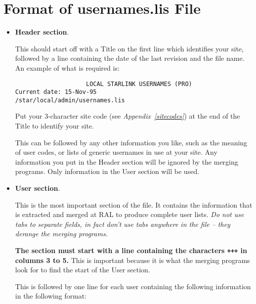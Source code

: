 \newpage

\section{\label{usernamesfile}Format of usernames.lis File}

\begin{itemize}

\item {\bf Header section}.

This should start off with a Title on the first line which identifies your site,
followed by a line containing the date of the last revision and the file name.
An example of what is required is:

\begin{verbatim}
                    LOCAL STARLINK USERNAMES (PRO)
Current date: 15-Nov-95                    /star/local/admin/usernames.lis
\end{verbatim}
Put your 3-character site code (see {\em Appendix~\ref{sitecodes}}) at the end
of the Title to identify your site.

This can be followed by any other information you like, such as the meaning
of user codes, or lists of generic usernames in use at your site.
Any information you put in the Header section will be ignored by the merging
programs.
Only information in the User section will be used.

\item {\bf User section}.

This is the most important section of the file.
It contains the information that is extracted and merged at RAL to produce
complete user lists.
{\em Do not use tabs to separate fields, in fact don't use tabs anywhere in
the file -- they derange the merging programs.}

{\bf The section must start with a line containing the characters
{\tt +++} in columns 3 to 5.}
This is important because it is what the merging programs look for to find
the start of the User section.

This is followed by one line for each user containing the following
information in the following format:


\end{itemize}
